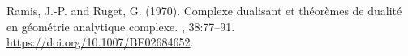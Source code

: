 Ramis, J.-P. and Ruget, G. (1970).
\newblock Complexe dualisant et th{\'e}or{\`e}mes de dualit{\'e} en
  g{\'e}om{\'e}trie analytique complexe.
, 38:77--91.
\newblock \url{https://doi.org/10.1007/BF02684652}.

